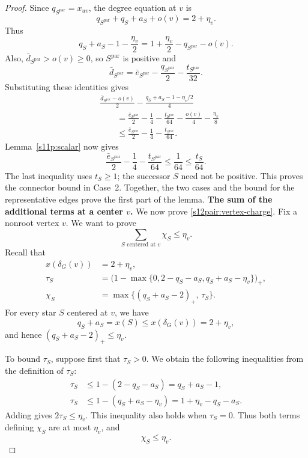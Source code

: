 \documentclass[11pt]{amsart}
\newcommand{\1}{\mathbbm{1}}
\begin{document}
\begin{proof}
{Since $q_{S^{\mathrm{par}}}=x_{uv}$, the degree equation at $v$ is}
\[
 q_{S^{\mathrm{par}}}+q_S+a_S+o(v)=2+\eta_v.
\]
Thus
\[
 q_S+a_S-1-\frac{\eta_v}{2}
 =1+\frac{\eta_v}{2}-q_{S^{\mathrm{par}}}-o(v).
\]
Also, $\bar d_{S^{\mathrm{par}}}>o(v)\ge0$, so $S^{\mathrm{par}}$ is positive and
\[
 \bar d_{S^{\mathrm{par}}}=\bar e_{S^{\mathrm{par}}}-\frac{q_{S^{\mathrm{par}}}}{2}-\frac{t_{S^{\mathrm{par}}}}{32}.
\]
Substituting these identities gives
\[
 \begin{aligned}
 &\frac{\bar d_{S^{\mathrm{par}}}-o(v)}{2}
       -\frac{q_S+a_S-1-\eta_v/2}{4}\\
 &\qquad=\frac{\bar e_{S^{\mathrm{par}}}}{2}-\frac14
       -\frac{t_{S^{\mathrm{par}}}}{64}-\frac{o(v)}4-\frac{\eta_v}{8}\\
 &\qquad\le\frac{\bar e_{S^{\mathrm{par}}}}{2}-\frac14-\frac{t_{S^{\mathrm{par}}}}{64}.
 \end{aligned}
\]
{Lemma~\ref{s11p:scalar} now gives
\[
 \frac{\bar e_{S^{\mathrm{par}}}}2-\frac14
   -\frac{t_{S^{\mathrm{par}}}}{64}
 \le\frac1{64}\le\frac{t_S}{64}.
\]
}
The last inequality uses $t_S\ge1$; the successor $S$ need
not be positive. This proves the connector bound in Case~2.
Together, the two cases and the bound for the representative
edges prove the first part of the lemma.
\smallskip\noindent
\textbf{The sum of the additional terms at a center $v$.}
We now prove \eqref{s12pair:vertex-charge}. Fix a nonroot vertex $v$. We want to prove
\[
 \sum_{S\text{ centered at }v}\chi_S\le\eta_v.
\]
Recall that
\[
 \begin{aligned}
 x(\delta_G(v))&=2+\eta_v,\\
 \tau_S
 &=\bigl(1-\max\{0,2-q_S-a_S,q_S+a_S-\eta_v\}\bigr)_+,\\
 \chi_S&=\max\{(q_S+a_S-2)_+,\,\tau_S\}.
 \end{aligned}
\]
For every star $S$ centered at $v$, we have
\[
 q_S+a_S=x(S)\le x(\delta_G(v))=2+\eta_v,
\]
and hence $(q_S+a_S-2)_+\le\eta_v$.

To bound $\tau_S$, suppose first that $\tau_S>0$.
We obtain the following inequalities from the definition of $\tau_S$:
\[
 \begin{aligned}
 \tau_S&\le1-(2-q_S-a_S)=q_S+a_S-1,\\
 \tau_S&\le1-(q_S+a_S-\eta_v)=1+\eta_v-q_S-a_S.
 \end{aligned}
\]
Adding gives $2\tau_S\le\eta_v$. This inequality also holds
when $\tau_S=0$. Thus both terms defining $\chi_S$ are at
most $\eta_v$, and
\[
 \chi_S\le\eta_v.
\]


\end{proof}
\end{document}
